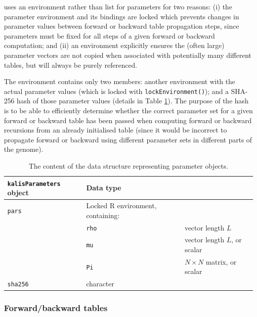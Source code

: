 \documentclass[pdflatex,referee,lineno,sn-nature]{sn-jnl}%
\let\proglang=\textsf
\providecommand{\DIFadd}[1]{{\protect\color{blue}\uwave{#1}}} %
\providecommand{\DIFaddend}{} %
\DeclareRobustCommand{\DIFaddend}{\DIFOaddend \let\includegraphics\DIFOincludegraphics} %
\begin{document}
\DIFadd{The }\texttt{\DIFadd{kalisParameters}} \DIFadd{object }\DIFaddend uses an environment rather than list for parameters for two reasons: (i) the parameter environment and its bindings are locked which prevents changes in parameter values between forward or backward table propagation steps, since parameters must be fixed for all steps of a given forward or backward computation; and (ii) an environment explicitly ensures the (often large) parameter vectors are not copied when associated with potentially many different tables, but will always be purely referenced.

The environment contains only two members: another environment with the actual parameter values (which is locked with \texttt{lockEnvironment()}); and a SHA-256 hash of those parameter values (details in Table \ref{tab:pars}).
The purpose of the hash is to be able to efficiently determine whether the correct parameter set for a given forward or backward table has been passed when computing forward or backward recursions from an already initialised table (since it would be incorrect to propagate forward or backward using different parameter sets in different parts of the genome).

\begin{table}[tbp]
	\centering
	\begin{tabular}{l|ll}
		\hline
		\texttt{kalisParameters} object & Data type & \\ \hline\hline
		\texttt{pars} & Locked \proglang{R} environment, containing: \\
		& \texttt{rho} & vector length $L$ \\
		& \texttt{mu} & vector length $L$, or scalar \\
		& \texttt{Pi} & $N \times N$ matrix, or scalar \\
		\texttt{sha256} & character & \\ \hline
	\end{tabular}
	\caption{The content of the data structure representing parameter objects.}
	\label{tab:pars}
\end{table}



\subsubsection*{Forward/backward tables}
\label{forwardbackward-tables}
\end{document}
